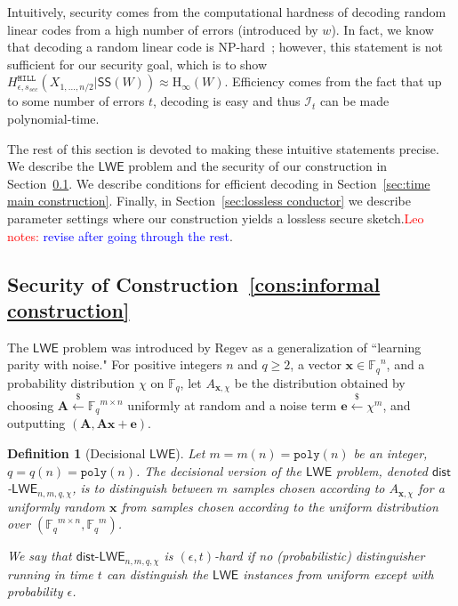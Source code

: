 \documentclass[11pt]{article}
\newcommand{\secref}[1]{\mbox{Section~\ref{#1}}}
\newcommand{\consref}[1]{\mbox{Construction~\ref{#1}}}
\newcommand{\class}[1]{{\ensuremath{\mathsf{#1}}}}
\newcommand{\sketch}{\ensuremath{\class{SS}}\xspace}
\newcommand{\vect}[1]{\ensuremath{\textbf{#1}}}
\newcommand{\Fq}{\ensuremath{\mathbb{F}_q}}
\newcommand{\hill}{\ensuremath{\mathtt{HILL}}\xspace}
\newcommand{\poly}{\ensuremath{\mathtt{poly}}\xspace}
\newcommand{\Hoo}{\mathrm{H}_\infty}
\newcommand{\lwe}{\class{LWE}}
\newcommand{\LWE}{\class{LWE}}
\newcommand{\distLWE}{\ensuremath{\class{dist\mbox{-}LWE}}}
\newtheorem{definition}[theorem]{Definition}
\newcommand{\authnote}[2]{{\textcolor{red}{\textsf{#1 notes: }\textcolor{blue}{ #2}}\marginpar{\textcolor{red}{\textbf{!!!!!}}}}}
\newcommand{\authnote}[2]{}
\newcommand{\lnote}[1]{{\authnote{Leo}{#1}}}
\newcommand{\ve}{\vect{e}}
\newcommand{\vA}{\vect{A}}
\newcommand{\vx}{\vect{x}}
\begin{document}
Intuitively, security comes from the computational hardness of decoding random linear codes from a high number of errors (introduced by $w$).  
In fact, we know that decoding a random linear code is NP-hard~\cite{berlekamp1978}; however, this statement is not sufficient for our security goal, which is to show  $H^{\hill}_{\epsilon, s_{sec}}(X_{1,..., n/2}|\sketch(W)) \approx \Hoo(W)$.  Efficiency comes from the fact that up to some number of errors $t$, decoding is easy and thus $\mathcal{I}_t$ can be made polynomial-time.

The rest of this section is devoted to making these intuitive statements precise.
 We describe the \class{LWE} problem and the security of our construction in \secref{subsec:LWE}.
We describe conditions for efficient decoding in \secref{sec:time main construction}.  Finally, in \secref{sec:lossless conductor} we describe parameter settings where our construction yields a lossless secure sketch.\lnote{revise after going through the rest}.



\subsection{Security of \consref{cons:informal construction}}
\label{subsec:LWE}
The $\LWE$ problem was introduced by Regev \cite{regev2005LWE, regevLWEsurvey} as a generalization of ``learning parity with noise." For positive integers $n$ and $q \ge 2$, a vector $\vx \in \Fq^n$, and a probability distribution $\chi$ on $\Fq$, let $A_{\vect{x}, \chi}$ be the distribution obtained by choosing $\vA \overset{\$}\leftarrow \Fq^{m\times n}$ uniformly at random and a noise term $\ve \overset{\$}\leftarrow \chi^m$, and outputting $(\vA, \vA\vx+\ve)$. 

\begin{definition}[Decisional $\lwe$]\label{def:dist-LWE}
Let $m = m(n) = \poly(n)$ be an integer, $q = q(n) = \poly(n)$. The decisional version of the $\LWE$ problem, denoted \class{dist}-$\LWE_{n, m, q, \chi}$, is to distinguish between $m$ samples chosen according to $A_{\vx, \chi}$ for a uniformly random $\vx$ from samples chosen according to the uniform distribution over $(\Fq^{m\times n}, \Fq^m)$. 

We say that $\distLWE_{n, m, q, \chi}$ is $(\epsilon, t)$-hard if no (probabilistic) distinguisher running in time $t$ can distinguish the $\lwe$ instances from uniform except with probability $\epsilon$.
\end{definition}
\end{document}
